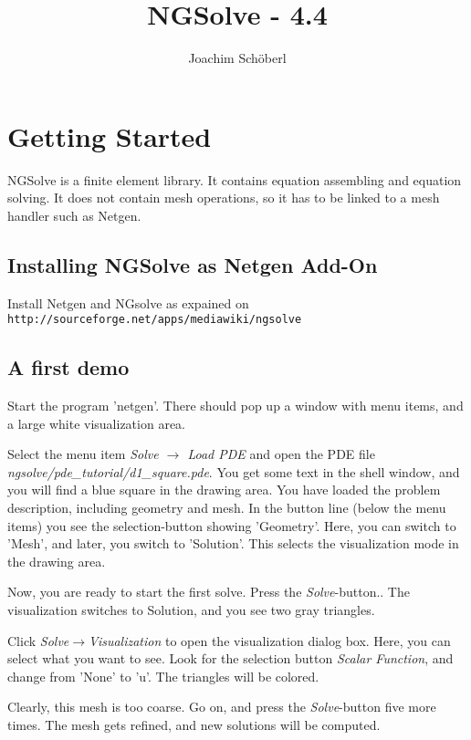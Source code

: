 \documentclass[12pt]{book}
\title{NGSolve - 4.4}
\author{Joachim Sch\"oberl}
\begin{document}
\maketitle
\tableofcontents

\chapter{Getting Started}

NGSolve is a finite element library. It contains equation assembling
and equation solving.  It does not contain mesh operations, so it has
to be linked to a mesh handler such as Netgen.

\section{Installing NGSolve as Netgen Add-On}

Install Netgen and NGsolve as expained on {\tt http://sourceforge.net/apps/mediawiki/ngsolve}


\section{A first demo}
Start the program 'netgen'. There should pop up
a window with menu items, and a large white visualization area.

Select the menu item {\em Solve $\rightarrow$ Load PDE} and open the PDE file {\em ngsolve/pde\_tutorial/d1\_square.pde}. 
You get some text in the shell window, and you will find a blue square in the drawing area. 
You have loaded the problem description, including geometry and mesh. In the button line (below the menu items) you see the selection-button showing 'Geometry'. Here, you can switch to 'Mesh', and later, you switch to 'Solution'. 
This selects the visualization mode in the drawing area.


Now, you are ready to start the first solve. Press the {\em Solve}-button.. 
The visualization switches to Solution, and you see two gray triangles.

Click {\em Solve$\rightarrow$Visualization} to open the visualization dialog box. Here,
you can select what you want to see. Look for the selection button {\em Scalar Function}, and change from 'None' to 'u'. The triangles will be colored.


Clearly, this mesh is too coarse. Go on, and press the {\em Solve}-button five more times. The mesh gets refined, and new solutions will be 
computed. 
\end{document}
